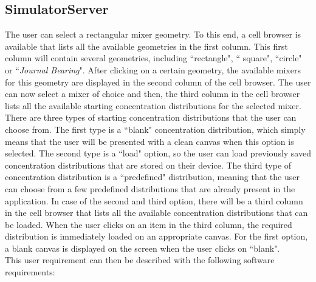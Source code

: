 



\subsection{SimulatorServer}

The user can select a rectangular mixer geometry. To this end, a cell browser is available that lists all the available geometries in the first column. This first column will contain several geometries, including ``rectangle", `` square", ``circle" or ``\emph{Journal Bearing}". After clicking on a certain geometry, the available mixers for this geometry are displayed in the second column of the cell browser. The user can now select a mixer of choice and then, the third column in the cell browser lists all the available starting concentration distributions for the selected mixer. There are three types of starting concentration distributions that the user can choose from. The first type is a ``blank" concentration distribution, which simply means that the user will be presented with a clean canvas when this option is selected. The second type is a ``load" option, so the user can load previously saved concentration distributions that are stored on their device. The third type of concentration distribution is a ``predefined" distribution, meaning that the user can choose from a few predefined distributions that are already present in the application. In case of the second and third option, there will be a third column in the cell browser that lists all the available concentration distributions that can be loaded. When the user clicks on an item in the third column, the required distribution is immediately loaded on an appropriate canvas. For the first option, a blank canvas is displayed on the screen when the user clicks on ``blank". \\
This user requirement can then be described with the following software requirements:

